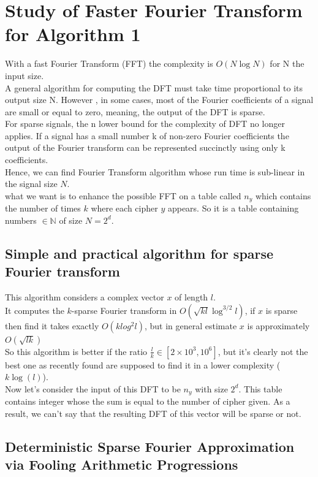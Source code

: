 \documentclass{article}
\begin{document}
\section{Study of Faster Fourier Transform for Algorithm 1}
With a fast Fourier Transform (FFT) the complexity is $O(N\log N)$ for N the input size.\\
A general algorithm for computing the DFT must take time proportional to its output size N. However , in some cases, most of the Fourier coefficients of a signal are small or equal to zero, meaning, the output of the DFT is sparse.\\
For sparse signals, the n lower bound for the complexity of DFT no longer applies. If a signal has a small number k of non-zero Fourier coefficients the output of the Fourier transform can be represented succinctly using only k coefficients.\\
Hence, we can find Fourier Transform algorithm whose run time is sub-linear in the signal size $N$.\\
what we want is to enhance the possible FFT on a table called $n_y$ which contains the number of times $k$ where each cipher $y$ appears. So it is a table containing numbers $\in \mathbb{N}$ of size $N=2^d$.\\


\subsection{Simple and practical algorithm for sparse Fourier transform}
This algorithm considers a complex vector $x$ of length $l$.\\
It computes the $k$-sparse Fourier transform in $O(\sqrt{kl}\log^{3/2}l)$, if $x$ is sparse then find it takes exactly $O(klog^{2}l)$, but in general estimate $x$ is approximately $O(\sqrt{lk})$\\
So this algorithm is better if the ratio $\frac{l}{k} \in [2 \times 10^3, 10^6]$, but it's clearly not the best one as recently found are supposed to find it in a lower complexity ($k\log(l)$).\\
Now let's consider the input of this DFT to be $n_y$ with size $2^d$. This table contains integer whose the sum is equal to the number of cipher given. As a result, we can't say that the resulting DFT of this vector will be sparse or not.

\subsection{Deterministic Sparse Fourier Approximation via Fooling Arithmetic Progressions}
\end{document}
